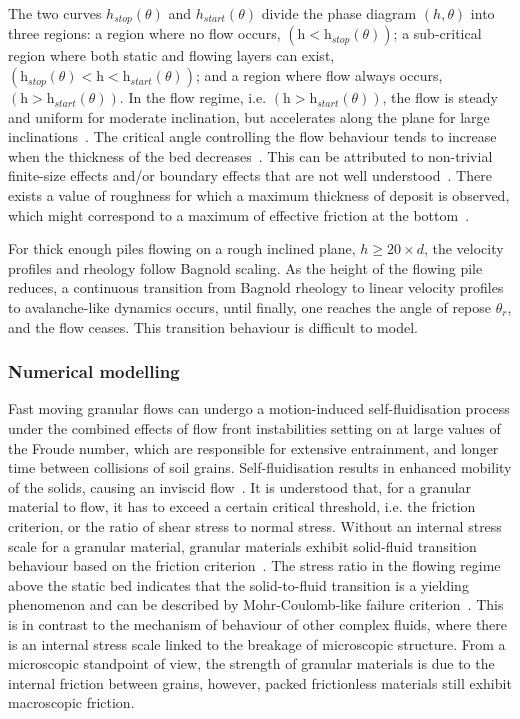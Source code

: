 The two curves $h_{stop}(\theta)$ and $h_{start}(\theta)$ divide the phase 
diagram $(h,\theta)$ into three regions: a region where no flow occurs, 
$(\textit{h}<\textit{h}_{\textit{stop}}(\theta))$; a sub-critical region where 
both static and flowing layers can exist, $(\textit{h}_{\textit{stop}}(\theta) 
< \textit{h} < \textit{h}_{\textit{start}}(\theta))$; and a region where flow 
always occurs, $(\textit{h}>\textit{h}_{\textit{start}}(\theta))$. In the flow 
regime, i.e. $(\textit{h}>\textit{h}_{\textit{start}}(\theta))$, the flow is 
steady and uniform for moderate inclination, but accelerates along the plane 
for large inclinations~\citep{Midi2004}. The critical angle controlling the 
flow behaviour tends to increase when the thickness of the bed 
decreases~\citep{Pouliquen2002a,Daerr1999}. This can be attributed to 
non-trivial finite-size effects and/or boundary effects that are not well 
understood~\citep{Forterre2008}. There exists a value of roughness for which a 
maximum thickness of deposit is observed, which might correspond to a maximum
of effective friction at the bottom~\citep{Midi2004}.

For thick enough piles flowing on a rough inclined plane, $h \ge 20 \times 
d$, the velocity profiles and rheology follow Bagnold scaling. As the height of 
the flowing pile reduces, a continuous transition from Bagnold rheology to
linear velocity profiles to avalanche-like dynamics occurs, until 
finally, one reaches the angle of repose $\theta_r$, and the
flow ceases. This transition behaviour is difficult to model. 

\subsubsection{Numerical modelling}

Fast moving granular flows can undergo a motion-induced self-fluidisation 
process under the combined effects of flow front instabilities setting on at 
large values of the Froude number, which are responsible for extensive 
entrainment, and longer time between collisions of soil grains. 
Self-fluidisation results in enhanced mobility of the solids, causing an 
inviscid flow~\citep{Bareschino2008}. It is understood that, for a granular 
material to flow, it has to exceed a certain critical threshold, i.e. the 
friction criterion, or the ratio of shear stress to normal stress. Without an
internal stress scale for a granular material, granular materials exhibit 
solid-fluid transition behaviour based on the friction 
criterion~\citep{Forterre2008}. The stress ratio in the flowing regime above 
the static bed indicates that the solid-to-fluid transition is a yielding 
phenomenon and can be described by Mohr-Coulomb-like failure 
criterion~\citep{Zhang1992}. This is in contrast to the mechanism of behaviour 
of other complex fluids, where there is an internal stress scale linked to the 
breakage of microscopic structure. From a microscopic standpoint of view, the 
strength of granular materials is due to the internal friction between 
grains, however, packed frictionless materials still exhibit macroscopic 
friction.

